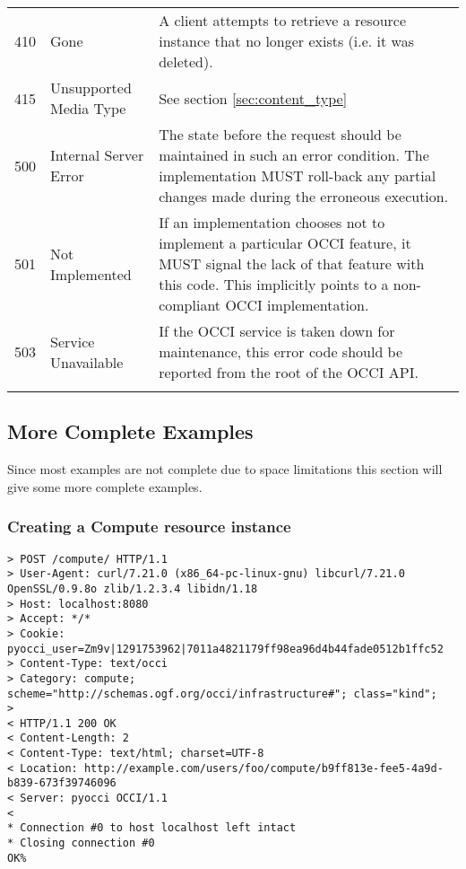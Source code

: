 \documentclass[10pt,a4paper]{article}
\begin{document}
{\begin{tabular}{l|l|p{3in}}
410 & Gone & A client attempts to retrieve a resource instance that no longer exists (i.e. it was deleted).\\
415 & Unsupported Media Type & See section \ref{sec:content_type}\\
500 & Internal Server Error & The state before the request should be maintained in such an error condition. The implementation MUST roll-back any partial changes made during the erroneous execution.\\
501 & Not Implemented & If an implementation chooses not to implement a particular OCCI feature, it MUST signal the lack of that feature with this code. This implicitly points to a non-compliant OCCI implementation.\\
503 & Service Unavailable & If the OCCI service is taken down for maintenance, this error code should be reported from the root of the OCCI API.\\
\botrule
\end{tabular}}

\subsection{More Complete Examples}
Since most examples are not complete due to space limitations this
section will give some more complete examples.

\subsubsection{Creating a Compute resource instance}
\begin{verbatim}
> POST /compute/ HTTP/1.1
> User-Agent: curl/7.21.0 (x86_64-pc-linux-gnu) libcurl/7.21.0 OpenSSL/0.9.8o zlib/1.2.3.4 libidn/1.18
> Host: localhost:8080
> Accept: */*
> Cookie: pyocci_user=Zm9v|1291753962|7011a4821179ff98ea96d4b44fade0512b1ffc52
> Content-Type: text/occi
> Category: compute; scheme="http://schemas.ogf.org/occi/infrastructure#"; class="kind";
> 
< HTTP/1.1 200 OK
< Content-Length: 2
< Content-Type: text/html; charset=UTF-8
< Location: http://example.com/users/foo/compute/b9ff813e-fee5-4a9d-b839-673f39746096
< Server: pyocci OCCI/1.1
< 
* Connection #0 to host localhost left intact
* Closing connection #0
OK% 
\end{verbatim}
\end{document}
